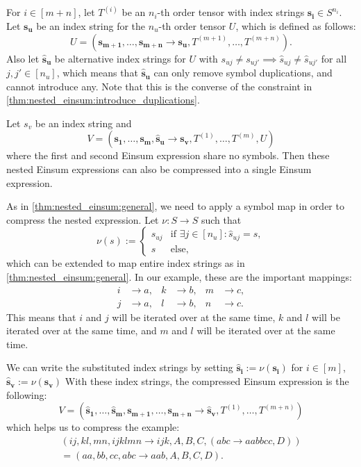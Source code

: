 \begin{theorem}
    \label{thm:nested_einsum:3}

    For $i \in [m + n]$, let $T^{(i)}$ be an $n_i$-th order tensor with index strings $\bm{s_i} \in S^{n_i}$.
    Let $\bm{s_u}$ be an index string for the $n_u$-th order tensor $U$, which is defined as follows:
    $$U = (\bm{s_{m + 1}},\dots,\bm{s_{m + n}} \rightarrow \bm{s_u}, T^{(m + 1)},\dots,T^{(m + n)}).$$
    Also let $\bm{\hat{s}_u}$ be alternative index strings for $U$ with $s_{uj} \neq s_{uj'} \implies \hat{s}_{uj} \neq \hat{s}_{uj'}$ for all $j, j' \in [n_u]$,
    which means that $\bm{\hat{s}_u}$ can only remove symbol duplications, and cannot introduce any.
    Note that this is the converse of the constraint in \cref{thm:nested_einsum:introduce_duplications}.

    Let $s_v$ be an index string and
    $$V = (\bm{s_1},\dots,\bm{s_m}, \bm{\hat{s}_u} \rightarrow \bm{s_v}, T^{(1)},\dots,T^{(m)}, U)$$
    where the first and second Einsum expression share no symbols.
    Then these nested Einsum expressions can also be compressed into a single Einsum expression.

    As in \cref{thm:nested_einsum:general}, we need to apply a symbol map in order to compress the nested expression.
    Let $\nu: S \rightarrow S$ such that
    $$\nu(s) := \begin{cases}
            s_{uj} & \text{if $\exists j \in [n_u]: \hat{s}_{uj} = s$}, \\
            s      & \text{else},
        \end{cases}$$
    which can be extended to map entire index strings as in \cref{thm:nested_einsum:general}.
    In our example, these are the important mappings:
    \begin{align*}
        i & \rightarrow a, & k & \rightarrow b, & m & \rightarrow c, \\
        j & \rightarrow a, & l & \rightarrow b, & n & \rightarrow c.
    \end{align*}
    This means that $i$ and $j$ will be iterated over at the same time, $k$ and $l$ will be iterated over at the same time, and $m$ and $l$ will be iterated over at the same time.

    We can write the substituted index strings by setting $\bm{\hat{s}_i} := \nu(\bm{s_i})$ for $i \in [m]$, $\bm{\hat{s}_v} := \nu(\bm{s_v})$
    With these index strings, the compressed Einsum expression is the following:
    $$V = (\bm{\hat{s}_1},\dots,\bm{\hat{s}_m}, \bm{s_{m + 1}}, \dots, \bm{s_{m + n}} \rightarrow \bm{\hat{s}_v}, T^{(1)},\dots,T^{(m + n)})$$
    which helps us to compress the example:
    \begin{gather*}
        (ij, kl, mn, ijklmn \rightarrow ijk, A, B, C, (abc \rightarrow aabbcc, D))\\
        = (aa, bb, cc, abc \rightarrow aab, A, B, C, D).
    \end{gather*}
\end{theorem}

